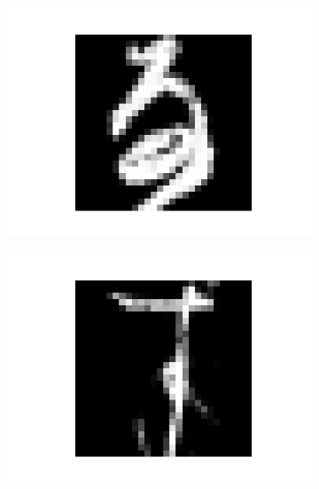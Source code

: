 \documentclass[14pt,a4paper]{extarticle}
\begin{document}
\begin{figure}[htb]
\begin{subfigure}[b]{0.3\textwidth}
    \includegraphics[width=\textwidth]{../res/kmnist/sample_4.png}
    \label{fig:kmnist_sample_4}
  \end{subfigure}
  \hfill
  \begin{subfigure}[b]{0.3\textwidth}
    \includegraphics[width=\textwidth]{../res/kmnist/sample_5.png}
    \label{fig:kmnist_sample_5}
  \end{subfigure}
  \hfill
  \begin{subfigure}[b]{0.3\textwidth}

\end{subfigure}
\end{figure}
\end{document}
